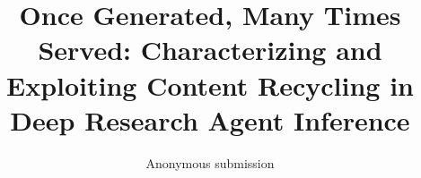 \documentclass[letterpaper]{article} %
\title{Once Generated, Many Times Served: Characterizing and Exploiting Content Recycling in Deep Research Agent Inference}
\author{Anonymous submission}
\begin{document}
\maketitle

\begin{abstract}

\end{abstract}




\end{document}
